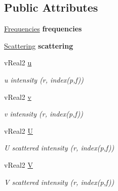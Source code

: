 \subsection*{Public Attributes}
\begin{DoxyCompactItemize}
\item 
\mbox{\label{structRadiation_a671301011aedcded797ed7380b8e62d2}} 
\mbox{\hyperlink{structFrequencies}{Frequencies}} {\bfseries frequencies}
\item 
\mbox{\label{structRadiation_a2312d1d46d0091dd9e03beeeda186943}} 
\mbox{\hyperlink{structScattering}{Scattering}} {\bfseries scattering}
\item 
\mbox{\label{structRadiation_adb6e1c2c5c515af5568f7426d74494db}} 
v\+Real2 \mbox{\hyperlink{structRadiation_adb6e1c2c5c515af5568f7426d74494db}{u}}
\begin{DoxyCompactList}\small\item\em u intensity (r, index(p,f)) \end{DoxyCompactList}\item 
\mbox{\label{structRadiation_a00797002bf4209bb24c1c8bb95f86375}} 
v\+Real2 \mbox{\hyperlink{structRadiation_a00797002bf4209bb24c1c8bb95f86375}{v}}
\begin{DoxyCompactList}\small\item\em v intensity (r, index(p,f)) \end{DoxyCompactList}\item 
\mbox{\label{structRadiation_a82c337ae7b2a51d06b36dac7a1b256ea}} 
v\+Real2 \mbox{\hyperlink{structRadiation_a82c337ae7b2a51d06b36dac7a1b256ea}{U}}
\begin{DoxyCompactList}\small\item\em U scattered intensity (r, index(p,f)) \end{DoxyCompactList}\item 
\mbox{\label{structRadiation_a9012339ab0e070b9e5e5ae9b2f3acc13}} 
v\+Real2 \mbox{\hyperlink{structRadiation_a9012339ab0e070b9e5e5ae9b2f3acc13}{V}}
\begin{DoxyCompactList}\small\item\em V scattered intensity (r, index(p,f)) \end{DoxyCompactList}\item 

\end{DoxyCompactItemize}
